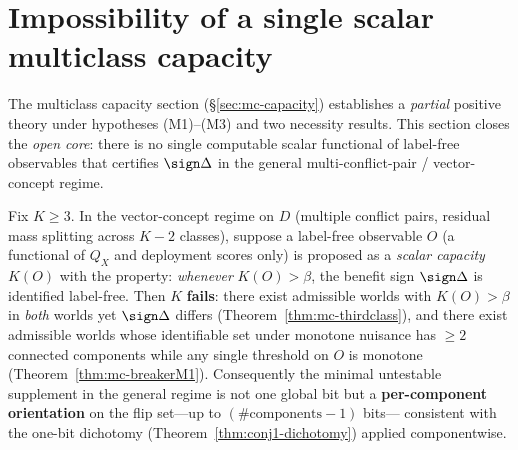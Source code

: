 \section{Impossibility of a single scalar multiclass capacity}\label{sec:mc-cap-impossibility}

The multiclass capacity section (\S\ref{sec:mc-capacity}) establishes a \emph{partial} positive
theory under hypotheses (M1)--(M3) and two necessity results. This section closes the
\emph{open core}: there is no single computable scalar functional of label-free observables that
certifies $\sign\Delta$ in the general multi-conflict-pair / vector-concept regime.

\begin{theorem}\label{thm:mc-cap-impossibility}
Fix $K\ge3$. In the vector-concept regime on $D$ (multiple conflict pairs, residual mass
splitting across $K{-}2$ classes), suppose a label-free observable $O$ (a functional of $Q_X$
and deployment scores only) is proposed as a \emph{scalar capacity} $K(O)$ with the property:
\emph{whenever} $K(O)>\beta$, the benefit sign $\sign\Delta$ is identified label-free. Then
$K$ \textbf{fails}: there exist admissible worlds with $K(O)>\beta$ in \emph{both} worlds yet
$\sign\Delta$ differs (Theorem~\ref{thm:mc-thirdclass}), and there exist admissible worlds
whose identifiable set under monotone nuisance has $\ge2$ connected components while any
single threshold on $O$ is monotone (Theorem~\ref{thm:mc-breakerM1}). Consequently the
minimal untestable supplement in the general regime is not one global bit but a
\textbf{per-component orientation} on the flip set---up to $(\#\text{components}-1)$ bits---
consistent with the one-bit dichotomy (Theorem~\ref{thm:conj1-dichotomy}) applied componentwise.
\end{theorem}

